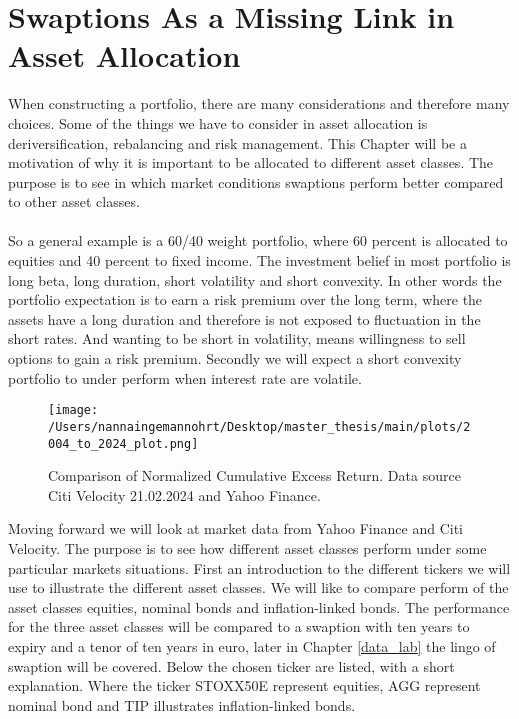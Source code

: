 \section{Swaptions As a Missing Link in Asset Allocation}
When constructing a portfolio, there are many considerations and therefore many choices. 
Some of the things we have to consider in asset allocation is deriversification, rebalancing 
and risk management. This Chapter will be a motivation of why it is important to be 
allocated to different asset classes. The purpose is to see in which market conditions
swaptions perform better compared to other asset classes.
\\\\
So a general  example is a 60/40 weight portfolio, where 60 percent is allocated to equities 
and 40 percent to fixed income. 
The investment belief in most portfolio is long beta, long duration, short volatility and short 
convexity. In other words the portfolio expectation is to earn a risk premium over the long term, 
where the assets have a long duration and therefore is not exposed to fluctuation in the short rates. 
And wanting to be short in volatility, means willingness to sell options to gain a risk premium. Secondly we will expect 
a short convexity portfolio to under perform when interest rate are volatile. 
\begin{figure}[H]
    \centering
    \texttt{[image: /Users/nannaingemannohrt/Desktop/master\_thesis/main/plots/2004\_to\_2024\_plot.png]}
    \caption{Comparison of Normalized Cumulative Excess Return. Data source Citi Velocity 21.02.2024 
    and Yahoo Finance.}
    \label{fig:2004_2024}
\end{figure}
\noindent
Moving forward we will look at market data from Yahoo Finance and Citi Velocity. 
The purpose is to see how different asset classes perform under some particular markets situations.
First an introduction to the different tickers we will use to illustrate the different asset classes. 
We will like to compare perform of the asset classes equities, nominal bonds and inflation-linked bonds. 
The performance for the three asset classes will be compared to a swaption with ten years to expiry and a tenor
of ten years in euro, later in Chapter \ref{data_lab} the lingo of swaption will be covered. 
Below the chosen ticker are listed, with a short explanation. Where the ticker STOXX50E represent equities, 
AGG represent nominal bond and TIP illustrates inflation-linked bonds.

